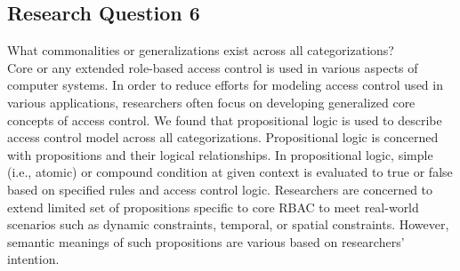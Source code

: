 \subsection{Research Question 6}

What commonalities or generalizations exist across all categorizations? \\

Core or any extended role-based access control is used in various aspects of computer systems. In order to reduce efforts for modeling access control used in various applications, researchers often focus on developing generalized core concepts of access control.
We found that propositional logic is used to describe access control model across all categorizations. Propositional logic is concerned with propositions and their logical relationships. In propositional logic, simple (i.e., atomic) or compound condition at given context is evaluated to true or false based on specified rules and access control logic. Researchers are concerned to extend limited set of propositions specific to core RBAC to meet real-world scenarios such as dynamic constraints, temporal, or spatial constraints. However, semantic meanings of such propositions are various based on researchers' intention.

